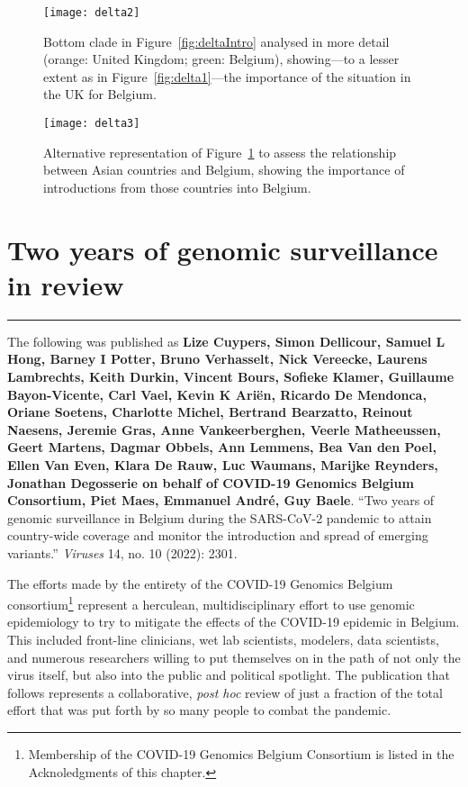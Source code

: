 \begin{figure}[ht]
  \centering
  \texttt{[image: delta2]}
  \caption[B.1.617.2 clade 2]{Bottom clade in Figure~\ref{fig:deltaIntro} analysed in more detail (orange: United Kingdom; green: Belgium), showing---to a lesser extent as in Figure~\ref{fig:delta1}---the importance of the situation in the UK for Belgium.}
  \label{fig:delta2}
\end{figure}

\begin{figure}[ht]
  \centering
  \texttt{[image: delta3]}
  \caption[B.1.617.2 alternate coloring]{Alternative representation of Figure~\ref{fig:delta2} to assess the relationship between Asian countries and Belgium, showing the importance of introductions from those countries into Belgium.}
  \label{fig:delta3}
\end{figure}

\section{Two years of genomic surveillance in review}

\singlespacing
\hrule
\vspace*{12pt}
The following was published as \textbf{Lize Cuypers, Simon Dellicour, Samuel L Hong, Barney I Potter, Bruno Verhasselt, Nick Vereecke, Laurens Lambrechts, Keith Durkin, Vincent Bours, Sofieke Klamer, Guillaume Bayon-Vicente, Carl Vael, Kevin K Ari\"{e}n, Ricardo De Mendonca, Oriane Soetens, Charlotte Michel, Bertrand Bearzatto, Reinout Naesens, Jeremie Gras, Anne Vankeerberghen, Veerle Matheeussen, Geert Martens, Dagmar Obbels, Ann Lemmens, Bea Van den Poel, Ellen Van Even, Klara De Rauw, Luc Waumans, Marijke Reynders, Jonathan Degosserie on behalf of COVID-19 Genomics Belgium Consortium, Piet Maes, Emmanuel Andr\'{e}, Guy Baele}.
``Two years of genomic surveillance in Belgium during the SARS-CoV-2 pandemic to attain country-wide coverage and monitor the introduction and spread of emerging variants.'' \textit{Viruses} 14, no.
10 (2022): 2301.

The efforts made by the entirety of the COVID-19 Genomics Belgium consortium\footnote{Membership of the COVID-19 Genomics Belgium Consortium is listed in the Acknoledgments of this chapter.} represent a herculean, multidisciplinary effort to use genomic epidemiology to try to mitigate the effects of the COVID-19 epidemic in Belgium.
This included front-line clinicians, wet lab scientists, modelers, data scientists, and numerous researchers willing to put themselves on in the path of not only the virus itself, but also into the public and political spotlight.
The publication that follows represents a collaborative, \textit{post hoc} review of just a fraction of the total effort that was put forth by so many people to combat the pandemic.

